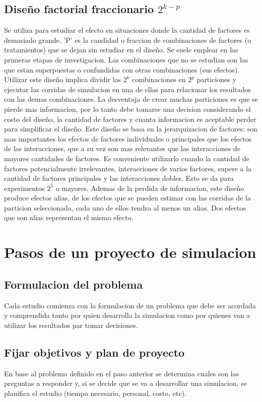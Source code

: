 \documentclass[a4paper]{article}
\begin{document}
\subsection*{Diseño factorial fraccionario $2^{k-p}$}
Se utiliza para estudiar el efecto en situaciones donde la cantidad de factores es demasiado
grande. 'P' es la candidad o fraccion de combinaciones de factores (o tratamientos) que se dejan sin estudiar 
en el diseño.
Se suele emplear en las primeras etapas de investigacion.
Las combinaciones que no se estudian son las que estan superpuestas o confundidas con otras 
combinaciones (sus efectos).
Utilizar este diseño implica dividir las $2^k$ combinaciones en $2^p$ particiones y ejecutar 
las corridas de simulacion en una de ellas para relacionar los resultados con las demas combinaciones.
La desventaja de crear muchas particiones es que se pierde mas informacion, por lo tanto debe 
tomarse una decision considerando el costo del diseño, la cantidad de factores y cuanta informacion 
es aceptable perder para simplificar el diseño.
Este diseño se basa en la jerarquizacion de factores: son mas importantes los efectos de factores 
individuales o principales que los efectos de las interacciones, que a su vez son mas relevantes que
las interacciones de mayores cantidades de factores.
Es conveniente utilizarlo cuando la cantidad de factores potencialmente irrelevantes, interacciones de 
varios factores, supere a la cantidad de factores principales y las interacciones dobles. Esto se da
para experimentos $2^5$ o mayores.
Ademas de la perdida de informacion, este diseño produce efectos alias, de los efectos que se pueden 
estimar con las corridas de la particion seleccionada, cada uno de ellos tendra al menos un alias. 
Dos efectos que son alias representan el mismo efecto.

\section*{Pasos de un proyecto de simulacion}
\subsection*{Formulacion del problema}
Cada estudio comienza con la formulacion de un problema que debe ser acordada
y comprendida tanto por quien desarrolla la simulacion como por quienes van 
a utilizar los resultados par tomar decisiones.

\subsection*{Fijar objetivos y plan de proyecto}
En base al problema definido en el paso anterior se determina cuales son las 
preguntas a responder y, si se decide que se va a desarrollar una simulacion,
se planifica el estudio (tiempo necesario, personal, costo, etc).
\end{document}
